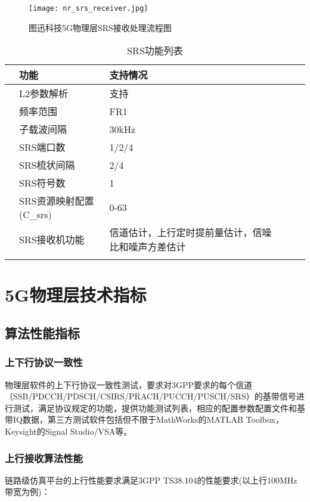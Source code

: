 \begin{figure}[H]
  \centering
  \texttt{[image: nr\_srs\_receiver.jpg]}
  \caption{图迅科技5G物理层SRS接收处理流程图}
  \label{F.1_13}
\end{figure}

\begin{table}[H]
    \centering
    \caption{SRS功能列表}
    \label{T.1_8}
    \begin{tabular}{llllll}
        \hline
          & 功能   & 支持情况 \\
        \hline
          & L2参数解析 & 支持 \\
        \hline
          & 频率范围 & FR1 \\
        \hline
          & 子载波间隔 & 30kHz\\
        \hline
          & SRS端口数 & 1/2/4 \\
        \hline
          & SRS梳状间隔 & 2/4 \\
        \hline
          & SRS符号数 & 1 \\
        \hline
          & SRS资源映射配置(C\_srs) & 0-63 \\
        \hline
          & SRS接收机功能 & 信道估计，上行定时提前量估计，信噪比和噪声方差估计 \\
        \hline{}
    \end{tabular}
\end{table}

\newpage
\section{5G物理层技术指标}
\subsection{算法性能指标}
\subsubsection{上下行协议一致性}
物理层软件的上下行协议一致性测试，要求对3GPP要求的每个信道（SSB/PDCCH/PDSCH/CSIRS/PRACH/PUCCH/PUSCH/SRS）的基带信号进行测试，满足协议规定的功能，提供功能测试列表，相应的配置参数配置文件和基带IQ数据，第三方测试软件包括但不限于MathWorks的MATLAB Toolbox，Keysight的Signal Studio/VSA等。

\subsubsection{上行接收算法性能}
链路级仿真平台的上行性能要求满足3GPP TS38.104的性能要求(以上行100MHz带宽为例)：\\

